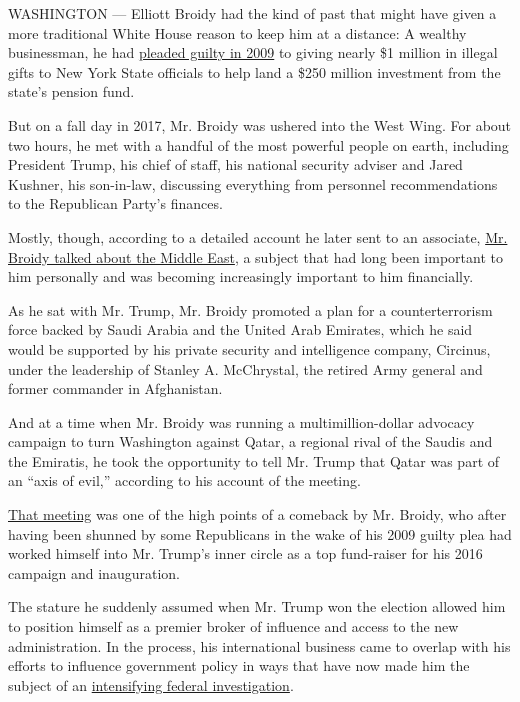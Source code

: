 WASHINGTON --- Elliott Broidy had the kind of past that might have given
a more traditional White House reason to keep him at a distance: A
wealthy businessman, he had
\href{https://dealbook.nytimes.com/2009/12/03/guilty-plea-in-new-york-pension-bribery-case/}{pleaded
guilty in 2009} to giving nearly \$1 million in illegal gifts to New
York State officials to help land a \$250 million investment from the
state's pension fund.

But on a fall day in 2017, Mr. Broidy was ushered into the West Wing.
For about two hours, he met with a handful of the most powerful people
on earth, including President Trump, his chief of staff, his national
security adviser and Jared Kushner, his son-in-law, discussing
everything from personnel recommendations to the Republican Party's
finances.

Mostly, though, according to a detailed account he later sent to an
associate,
\href{https://www.nytimes.com/2018/03/21/us/politics/george-nader-elliott-broidy-uae-saudi-arabia-white-house-influence.html}{Mr.
Broidy talked about the Middle East}, a subject that had long been
important to him personally and was becoming increasingly important to
him financially.

As he sat with Mr. Trump, Mr. Broidy promoted a plan for a
counterterrorism force backed by Saudi Arabia and the United Arab
Emirates, which he said would be supported by his private security and
intelligence company, Circinus, under the leadership of Stanley A.
McChrystal, the retired Army general and former commander in
Afghanistan.

And at a time when Mr. Broidy was running a multimillion-dollar advocacy
campaign to turn Washington against Qatar, a regional rival of the
Saudis and the Emiratis, he took the opportunity to tell Mr. Trump that
Qatar was part of an ``axis of evil,'' according to his account of the
meeting.

\href{https://www.rollingstone.com/politics/politics-features/elliott-broidy-donald-trump-swamp-793159/}{That
meeting} was one of the high points of a comeback by Mr. Broidy, who
after having been shunned by some Republicans in the wake of his 2009
guilty plea had worked himself into Mr. Trump's inner circle as a top
fund-raiser for his 2016 campaign and inauguration.

The stature he suddenly assumed when Mr. Trump won the election allowed
him to position himself as a premier broker of influence and access to
the new administration. In the process, his international business came
to overlap with his efforts to influence government policy in ways that
have now made him the subject of an
\href{https://www.nytimes.com/2019/07/08/us/politics/elliott-broidy-trump.html}{intensifying
federal investigation}.

